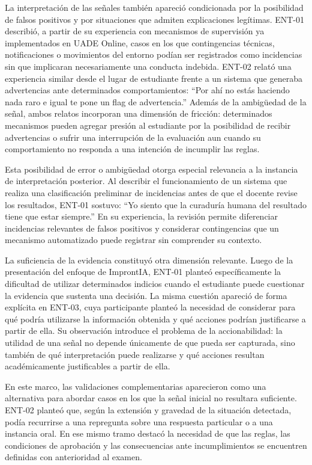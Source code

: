 La interpretación de las señales también apareció condicionada por la posibilidad de falsos positivos y por situaciones que admiten explicaciones legítimas. ENT-01 describió, a partir de su experiencia con mecanismos de supervisión ya implementados en UADE Online, casos en los que contingencias técnicas, notificaciones o movimientos del entorno podían ser registrados como incidencias sin que implicaran necesariamente una conducta indebida. ENT-02 relató una experiencia similar desde el lugar de estudiante frente a un sistema que generaba advertencias ante determinados comportamientos: ``Por ahí no estás haciendo nada raro e igual te pone un flag de advertencia.'' Además de la ambigüedad de la señal, ambos relatos incorporan una dimensión de fricción: determinados mecanismos pueden agregar presión al estudiante por la posibilidad de recibir advertencias o sufrir una interrupción de la evaluación aun cuando su comportamiento no responda a una intención de incumplir las reglas.

Esta posibilidad de error o ambigüedad otorga especial relevancia a la instancia de interpretación posterior. Al describir el funcionamiento de un sistema que realiza una clasificación preliminar de incidencias antes de que el docente revise los resultados, ENT-01 sostuvo: ``Yo siento que la curaduría humana del resultado tiene que estar siempre.'' En su experiencia, la revisión permite diferenciar incidencias relevantes de falsos positivos y considerar contingencias que un mecanismo automatizado puede registrar sin comprender su contexto.

La suficiencia de la evidencia constituyó otra dimensión relevante. Luego de la presentación del enfoque de ImprontIA, ENT-01 planteó específicamente la dificultad de utilizar determinados indicios cuando el estudiante puede cuestionar la evidencia que sustenta una decisión. La misma cuestión apareció de forma explícita en ENT-03, cuya participante planteó la necesidad de considerar para qué podría utilizarse la información obtenida y qué acciones podrían justificarse a partir de ella. Su observación introduce el problema de la accionabilidad: la utilidad de una señal no depende únicamente de que pueda ser capturada, sino también de qué interpretación puede realizarse y qué acciones resultan académicamente justificables a partir de ella.

En este marco, las validaciones complementarias aparecieron como una alternativa para abordar casos en los que la señal inicial no resultara suficiente. ENT-02 planteó que, según la extensión y gravedad de la situación detectada, podía recurrirse a una repregunta sobre una respuesta particular o a una instancia oral. En ese mismo tramo destacó la necesidad de que las reglas, las condiciones de aprobación y las consecuencias ante incumplimientos se encuentren definidas con anterioridad al examen.

